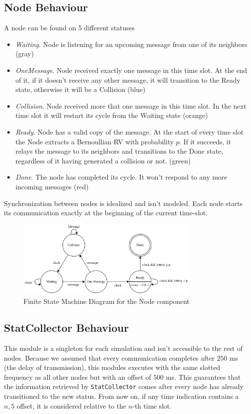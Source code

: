 \subsection{Node Behaviour}
A node can be found on 5 different statuses
\begin{itemize}
\item \textit{Waiting}. Node is listening for an upcoming message from one of its neighbors (gray)
\item \textit{OneMessage}. Node received exactly one message in this time slot. At the end of it, if it doesn't receive any other message, it will transition to the Ready state, otherwise it will be a Collision (blue)
\item \textit{Collision}. Node received more that one message in this time slot. In the next time slot it will restart its cycle from the Waiting state (orange)
\item \textit{Ready}. Node has a valid copy of the message. At the start of every time slot the Node extracts a Bernoullian RV with probability $p$. If it succeeds, it relays the message to its neighbors and transitions to the Done state, regardless of it having generated a collision or not. (green)
\item \textit{Done}. The node has completed its cycle. It won't respond to any more incoming messages (red)
\end{itemize}
Synchronization between nodes is idealized and isn't modeled. Each node starts its communication exactly at the beginning of the current time-slot.

\begin{figure}
\centering
\includegraphics[width=0.8\textwidth]{./images/fsm.png}
\caption{Finite State Machine Diagram for the Node component}
\label{fig:fsm}
\end{figure}
\subsection{StatCollector Behaviour}
This module is a singleton for each simulation and isn't accessible to the rest of nodes. Because we assumed that every communication completes after $250$ ms (the delay of transmission), this modules executes with the same slotted frequency as all other nodes but with an offset of $500$ ms. This guarantees that the information retrieved by \texttt{StatCollector} comes after every node has already transitioned to the new status. From now on, if any time indication contains a $n,5$ offset, it is considered relative to the $n$-th time slot.

